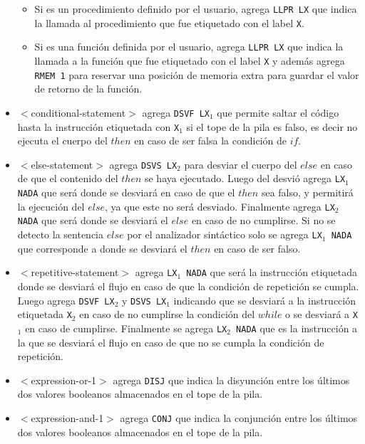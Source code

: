\begin{itemize}
\begin{itemize}
	\item Si es un procedimiento definido por el usuario, agrega \texttt{LLPR LX} que indica la llamada al procedimiento que fue etiquetado con el label \texttt{X}.
	\item Si es una función definida por el usuario, agrega \texttt{LLPR LX} que indica la llamada a la función que fue etiquetado con el label \texttt{X} y además agrega \texttt{RMEM 1} para reservar una posición de memoria extra para guardar el valor de retorno de la función.
\end{itemize}
\item $<$conditional-statement$>$ agrega \texttt{DSVF LX$_{1}$} que permite saltar el código hasta la instrucción etiquetada con \texttt{X$_{1}$} si el tope de la pila es falso, es decir no ejecuta el cuerpo del $then$ en caso de ser falsa la condición de $if$.
\item $<$else-statement$>$ agrega \texttt{DSVS LX$_{2}$} para desviar el cuerpo del $else$ en caso de que el contenido del $then$ se haya ejecutado. Luego del desvió agrega \texttt{LX$_{1}$ NADA} que será donde se desviará en caso de que el $then$ sea falso, y permitirá la ejecución del $else$, ya que este no será desviado. Finalmente agrega \texttt{LX$_{2}$ NADA} que será donde se desviará el $else$ en caso de no cumplirse. Si no se detecto la sentencia $else$ por el analizador sintáctico solo se agrega \texttt{LX$_{1}$ NADA} que corresponde a donde se desviará el $then$ en caso de ser falso.
\item $<$repetitive-statement$>$ agrega \texttt{LX$_{1}$ NADA} que será la instrucción etiquetada donde se desviará el flujo en caso de que la condición de repetición se cumpla. Luego agrega \texttt{DSVF LX$_{2}$} y \texttt{DSVS LX$_{1}$} indicando que se desviará a la instrucción etiquetada \texttt{X$_{2}$} en caso de no cumplirse la condición del $while$ o se desviará a \texttt{X$_{1}$} en caso de cumplirse. Finalmente se agrega \texttt{LX$_{2}$ NADA} que es la instrucción a la que se desviará el flujo en caso de que no se cumpla la condición de repetición.
\item $<$expression-or-1$>$ agrega \texttt{DISJ} que indica la disyunción entre los últimos dos valores booleanos almacenados en el tope de la pila.
\item $<$expression-and-1$>$ agrega \texttt{CONJ} que indica la conjunción entre los últimos dos valores booleanos almacenados en el tope de la pila.

\end{itemize}
